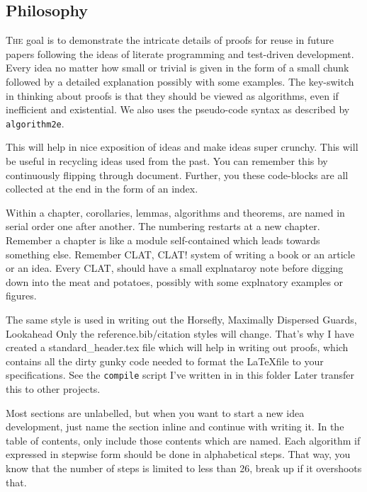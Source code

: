 \begin{appendices}
\chapter{Philosophy}

 \lettrine{T}{he} goal is to demonstrate the intricate details of proofs for reuse in future papers
 following the ideas of literate programming and test-driven development. Every idea
 no matter how small or trivial is given in the form of a small chunk followed by a detailed
 explanation possibly with some examples. The key-switch in thinking about proofs is that they
 should be viewed as algorithms, even if inefficient and existential. We also uses the
 pseudo-code syntax as described by \texttt{algorithm2e}.

 \newchunk This will help in nice exposition of ideas and make ideas super crunchy. This will be useful
 in recycling ideas used from the past. You can remember this by continuously flipping through
 document. Further, you these code-blocks are all collected at the end in the form of an index.

  Within a chapter, corollaries, lemmas, algorithms and theorems, are named in serial order
 one after another. The numbering restarts at a new chapter. Remember a chapter is like a module
 self-contained which leads towards something else. Remember CLAT, CLAT! system of writing a book
 or an article or an idea. Every CLAT, should have a small explnataroy note before digging down
 into the meat and potatoes, possibly with some explnatory examples or figures. 

 \newchunk The same style is used in writing out the Horsefly, Maximally Dispersed Guards, Lookahead
 Only the reference.bib/citation styles will change. That's why I have created a standard\_header.tex
 file which will help in writing out proofs, which contains all the dirty gunky code needed to
 format the \LaTeX file to your specifications.
 {\footnotesize \color{red} See the \verb|compile| script I've written in in this folder }
 Later transfer this to other projects. 
 
 \newchunk Most sections are unlabelled, but when you want to start a new idea development, just
 name the section inline and continue with writing it. In the table of contents, only include
 those contents which are named. Each algorithm if expressed in stepwise form should be done
 in alphabetical steps. That way, you know that the number of steps is limited to less than 26,
 break up if it overshoots that. 


\end{appendices}
